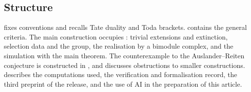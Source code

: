 \subsection*{Structure}

 fixes conventions and recalls Tate duality and Toda
brackets.  contains the general criteria. The main
construction occupies : trivial extensions and extinction, selection data and the
group, the realisation by a bimodule complex, and the simulation with the main
theorem. The counterexample to the Auslander--Reiten conjecture is constructed
in ,
and  discusses obstructions to smaller constructions.
 describes the computations used,
 the verification and formalisation record,
 the third preprint of the release, and
 the use of AI in the preparation of this article.
